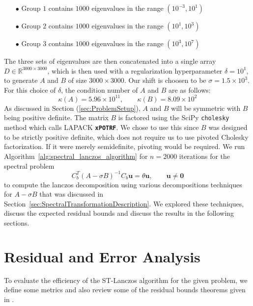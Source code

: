 \begin{itemize}
    \item[$\bullet$] Group $1$ contains $1000$ eigenvalues in the range $(10^{-3}, 10^{1})$
    \item[$\bullet$] Group $2$ contains $1000$ eigenvalues in the range $(10^1, 10^3)$
    \item[$\bullet$] Group $3$ contains $1000$ eigenvalues in the range $(10^3, 10^7)$
\end{itemize}

The three sets of eigenvalues are then concatenated into a single array $D \in \mathbb{R}^{3000 \times 3000}$, which is then used with a regularization hyperparameter $\delta = 10^{1}$, to generate $A$ and $B$ of size $3000 \times 3000$. Our shift is choosen to be $\sigma = 1.5 \times 10^3$. For this choice of $\delta$, the condition number of $A$ and $B$ are as follows:
\begin{equation*}
    \kappa(A) = 5.96 \times 10^{11}, \qquad \kappa(B) = 8.09 \times 10^2
\end{equation*}
As discussed in Section (\ref{sec:ProblemSetup}), $A$ and $B$ will be symmetric with $B$ being positive definite. The matrix $B$ is factored using the SciPy \texttt{cholesky} method which calls LAPACK \textbf{\texttt{xPOTRF}}. We chose to use this since $B$ was designed to be strictly positive definite, which does not require us to use  pivoted Cholesky factorization. If it were merely semidefinite, pivoting would be required. We run Algorithm~\ref{alg:spectral_lanczos_algorithm} for $n=2000$ iterations for the spectral problem
\begin{equation}\label{eq:ShiftedInvertedProblem2}
	C_b^T (A-\sigma B)^{-1} C_b \mathbf{u} = \theta \mathbf{u}, \qquad \mathbf{u} \neq \mathbf{0}
\end{equation}
to compute the lanczos decomposition using various decompositions techniques for $A - \sigma B$ that was discussed in Section~\ref{sec:SpectralTransformationDescription}. We explored these techniques, discuss the expected residual bounds and discuss the results in the following sections.

\section{Residual and Error Analysis}
To evaluate the efficiency of the ST-Lanczos algorithm for the given problem, we define some metrics and also review some of the residual bounds theorems given in \cite{stewart2024spectraltransformationdensesymmetric}.

